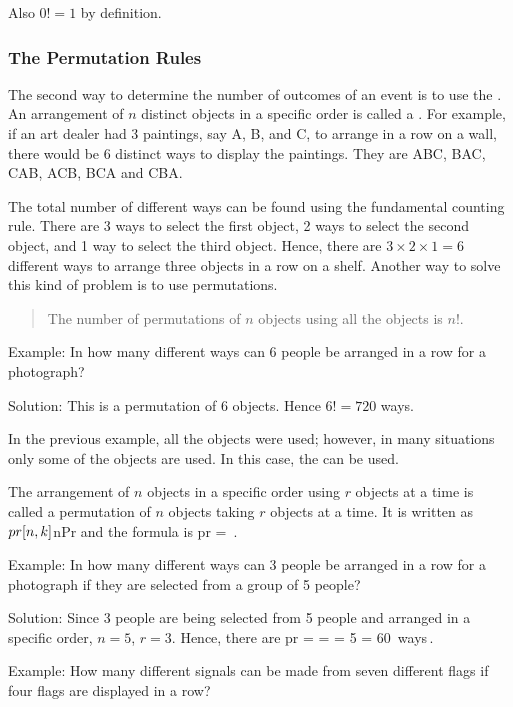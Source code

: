 Also $0! = 1$ by definition.


\subsubsection{The Permutation Rules}
The second way to determine the number of outcomes of an event is to use the . An arrangement of $n$ distinct objects in a specific order is called a . For example, if an art dealer had 3 paintings, say A, B, and C, to arrange in a row on a wall, there would be 6 distinct ways to display the paintings. They are ABC, BAC, CAB, ACB, BCA and CBA.

The total number of different ways can be found using the fundamental counting rule. There are 3 ways to select the first object, 2 ways to select the second object, and 1 way to select the third object. Hence, there are $3\times 2\times 1 = 6$ different ways to arrange three objects in a row on a shelf.
Another way to solve this kind of problem is to use permutations. 
\begin{quote}
The number of permutations of $n$ objects using all the objects is $n!$.
\end{quote}

Example: In how many different ways can 6 people be arranged in a row for a photograph?

Solution: This is a permutation of 6 objects. Hence $6! = 720$ ways.

In the previous example, all the objects were used; however, in many situations only some of the objects are used. In this case, the  can be used.

The arrangement of $n$ objects in a specific order using $r$ objects at a time is called a permutation of $n$ objects taking $r$ objects at a time. It is written as $pr\!\left[{n,k}\right]$nPr and the formula is
\beq
pr = \,.
\eeq

Example: In how many different ways can 3 people be arranged in a row for a photograph if they are selected from a group of 5 people?

Solution: Since 3 people are being selected from 5 people and arranged in a specific order, $n = 5$, $r = 3$. Hence, there are
\beq
pr =  =  = 5 = \SI{60}{ways}\,.
\eeq

Example: How many different signals can be made from seven different flags if four flags are displayed in a row?

